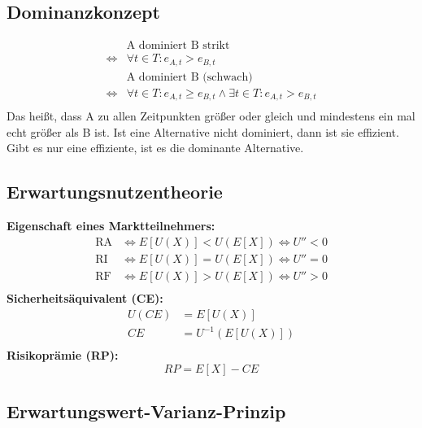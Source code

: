 \documentclass[leqno]{scrartcl}
\begin{document}
\begin{multicols}{4}
\subsection{Dominanzkonzept}
\begin{align*}
&\text{A dominiert B strikt}\\
\Leftrightarrow  &\forall t \in T : e_{A,t} > e_{B,t}\\
&\text{A dominiert B (schwach)}\\
\Leftrightarrow  &\forall t \in T : e_{A,t} \geq e_{B,t} \wedge \exists t \in T : e_{A,t} > e_{B,t}\\
\end{align*}
Das heißt, dass A zu allen Zeitpunkten größer oder gleich und mindestens ein mal 
echt größer als B ist. Ist eine Alternative nicht dominiert, dann ist sie 
effizient. Gibt es nur eine effiziente, ist es die dominante Alternative.

\subsection{Erwartungsnutzentheorie}

\textbf{Eigenschaft eines Marktteilnehmers:}
  \begin{equation*}
    \begin{split}
      \text{RA}    &\iff E[U(X)] < U(E[X]) \iff U'' < 0\\
      \text{RI} &\iff E[U(X)] = U(E[X]) \iff U'' = 0\\
      \text{RF}      &\iff E[U(X)] > U(E[X]) \iff U'' > 0\\
    \end{split}
  \end{equation*}
\textbf{Sicherheitsäquivalent (CE):}
  \begin{equation*}
    \begin{split}
      U(CE) &= E[U(X)]\\
        CE &= U^{-1}(E[U(X)])\\
    \end{split}
  \end{equation*}
\textbf{Risikoprämie (RP):}
  \begin{equation*}
    RP = E[X] - CE
  \end{equation*}

\subsection{Erwartungswert-Varianz-Prinzip}


\end{multicols}
\end{document}
